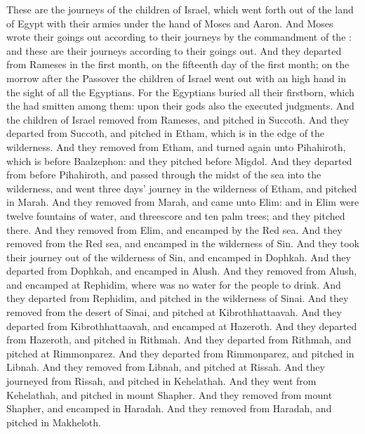 \begin{biblechapter} %
 These are the journeys of the children of Israel, which went forth out of the land of Egypt with their armies under the hand of Moses and Aaron.
\verse And Moses wrote their goings out according to their journeys by the commandment of the \LORD: and these are their journeys according to their goings out.
\verse And they departed from Rameses in the first month, on the fifteenth day of the first month; on the morrow after the Passover the children of Israel went out with an high hand in the sight of all the Egyptians.
\verse For the Egyptians buried all their firstborn, which the \LORD had smitten among them: upon their gods also the \LORD executed judgments.
\verse And the children of Israel removed from Rameses, and pitched in Succoth.
\verse And they departed from Succoth, and pitched in Etham, which is in the edge of the wilderness.
\verse And they removed from Etham, and turned again unto Pihahiroth, which is before Baalzephon: and they pitched before Migdol.
\verse And they departed from before Pihahiroth, and passed through the midst of the sea into the wilderness, and went three days' journey in the wilderness of Etham, and pitched in Marah.
\verse And they removed from Marah, and came unto Elim: and in Elim were twelve fountains of water, and threescore and ten palm trees; and they pitched there.
\verse And they removed from Elim, and encamped by the Red sea.
\verse And they removed from the Red sea, and encamped in the wilderness of Sin.
\verse And they took their journey out of the wilderness of Sin, and encamped in Dophkah.
\verse And they departed from Dophkah, and encamped in Alush.
\verse And they removed from Alush, and encamped at Rephidim, where was no water for the people to drink.
\verse And they departed from Rephidim, and pitched in the wilderness of Sinai.
\verse And they removed from the desert of Sinai, and pitched at Kibrothhattaavah.
\verse And they departed from Kibrothhattaavah, and encamped at Hazeroth.
\verse And they departed from Hazeroth, and pitched in Rithmah.
\verse And they departed from Rithmah, and pitched at Rimmonparez.
\verse And they departed from Rimmonparez, and pitched in Libnah.
\verse And they removed from Libnah, and pitched at Rissah.
\verse And they journeyed from Rissah, and pitched in Kehelathah.
\verse And they went from Kehelathah, and pitched in mount Shapher.
\verse And they removed from mount Shapher, and encamped in Haradah.
\verse And they removed from Haradah, and pitched in Makheloth.

\end{biblechapter}
